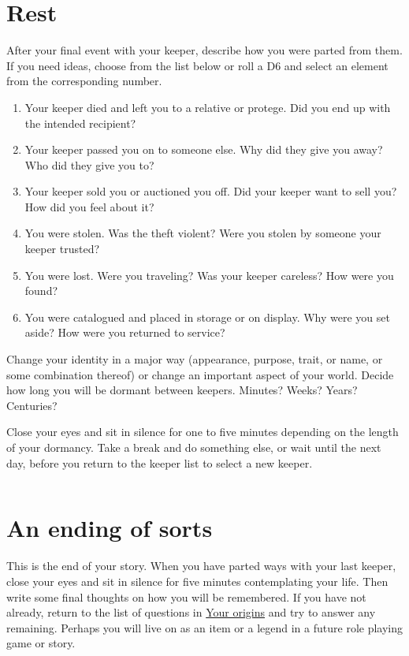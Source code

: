 \documentclass[
  a5paper,
]{article}
\providecommand{\tightlist}{%
  \setlength{\itemsep}{0pt}\setlength{\parskip}{0pt}}
\begin{document}
\hypertarget{rest}{%
\section{Rest}\label{rest}}

After your final event with your keeper, describe how you were parted from them. If you need ideas, choose from the list below or roll a D6 and select an element from the corresponding number.

\begin{enumerate}
\def\labelenumi{\arabic{enumi}.}
\tightlist
\item
  Your keeper died and left you to a relative or protege. Did you end up with the intended recipient?
\item
  Your keeper passed you on to someone else. Why did they give you away? Who did they give you to?
\item
  Your keeper sold you or auctioned you off. Did your keeper want to sell you? How did you feel about it?
\item
  You were stolen. Was the theft violent? Were you stolen by someone your keeper trusted?
\item
  You were lost. Were you traveling? Was your keeper careless? How were you found?
\item
  You were catalogued and placed in storage or on display. Why were you set aside? How were you returned to service?
\end{enumerate}

Change your identity in a major way (appearance, purpose, trait, or name, or some combination thereof) or change an important aspect of your world. Decide how long you will be dormant between keepers. Minutes? Weeks? Years? Centuries?

Close your eyes and sit in silence for one to five minutes depending on the length of your dormancy. Take a break and do something else, or wait until the next day, before you return to the keeper list to select a new keeper.

\pagebreak

\(~\)

\hypertarget{an-ending-of-sorts}{%
\section{An ending of sorts}\label{an-ending-of-sorts}}

This is the end of your story. When you have parted ways with your last keeper, close your eyes and sit in silence for five minutes contemplating your life. Then write some final thoughts on how you will be remembered. If you have not already, return to the list of questions in \protect\hyperlink{your-origins}{Your origins} and try to answer any remaining. Perhaps you will live on as an item or a legend in a future role playing game or story.
\end{document}
